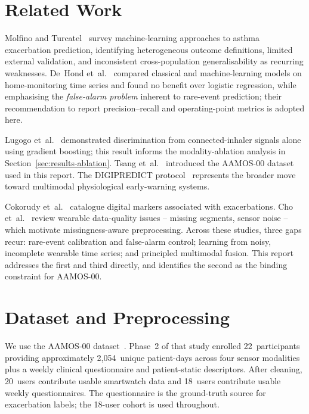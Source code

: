 \documentclass[11pt,a4paper]{article}
\begin{document}
\section{Related Work}\label{sec:lit}

Molfino and Turcatel~\cite{molfino2024} survey machine-learning
approaches to asthma exacerbation prediction, identifying heterogeneous
outcome definitions, limited external validation, and inconsistent
cross-population generalisability as recurring weaknesses.  De~Hond
et~al.~\cite{dehond2022} compared classical and machine-learning models
on home-monitoring time series and found no benefit over logistic
regression, while emphasising the \emph{false-alarm problem} inherent
to rare-event prediction; their recommendation to report
precision--recall and operating-point metrics is adopted here.

Lugogo et~al.~\cite{lugogo2022} demonstrated discrimination from
connected-inhaler signals alone using gradient boosting; this result
informs the modality-ablation analysis in
Section~\ref{sec:results-ablation}.  Tsang et~al.~\cite{tsang2023}
introduced the AAMOS-00 dataset used in this report.  The DIGIPREDICT
protocol~\cite{chan2024} represents the broader move toward
multimodal physiological early-warning systems.

Cokorudy et~al.~\cite{cokorudy2024} catalogue digital markers
associated with exacerbations.  Cho et~al.~\cite{cho2021} review
wearable data-quality issues -- missing segments, sensor noise -- which
motivate missingness-aware preprocessing.  Across these studies, three
gaps recur: rare-event calibration and false-alarm control; learning
from noisy, incomplete wearable time series; and principled
multimodal fusion.  This report addresses the first and third
directly, and identifies the second as the binding constraint for
AAMOS-00.

\section{Dataset and Preprocessing}\label{sec:data}

We use the AAMOS-00 dataset~\cite{tsang2023,datashare}.  Phase~2 of
that study enrolled 22~participants providing approximately
2{,}054~unique patient-days across four sensor modalities plus a
weekly clinical questionnaire and patient-static descriptors.  After
cleaning, 20~users contribute usable smartwatch data and 18~users
contribute usable weekly questionnaires.  The questionnaire is the
ground-truth source for exacerbation labels; the 18-user cohort is
used throughout.
\end{document}
